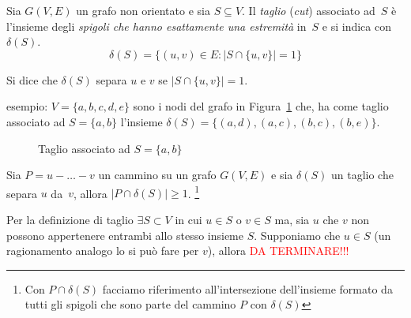 \begin{defn}[taglio]
Sia ${G(V,E)}$ un grafo non orientato e sia ${S \subseteq V}$. Il \emph{taglio} (\emph{cut})
associato ad~$S$ è l'insieme degli \emph{spigoli che hanno esattamente una estremità} 
in~$S$ e si indica con~$\delta(S)$.
\[ \delta(S) = \{(u,v) \in E \colon | S \cap \{u,v\} | = 1 \} \]
\end{defn}
Si dice che $\delta(S)$ separa $u$ e $v$ se ${|S \cap \{u,v\}| = 1}$.

\begin{ese}
esempio: ${V=\{a,b,c,d,e\}}$ sono i nodi del grafo in Figura~\ref{fig:es_taglio} che, ha come
taglio associato ad ${S = \{a, b\}}$ l'insieme ${\delta(S)= \{(a,d),(a,c),(b,c),(b,e)\}}$.
    \begin{figure}
        \centering
        \caption{Taglio associato ad $S = \{ a, b \}$} 
        \label{fig:es_taglio}
    \end{figure}
\end{ese}

\begin{thm}
Sia ${P = u - \dots - v}$ un cammino su un grafo ${G(V,E)}$ e sia $\delta(S)$ un taglio che
separa $u$ da~$v$, allora ${ |P \cap \delta(S)| \geqslant 1 }$. \footnote{Con
${P \cap \delta(S)}$ facciamo riferimento all'intersezione dell'insieme formato da
tutti gli spigoli che sono parte del cammino $P$ con $\delta(S)$}
\label{thm:taglio_cammino}
\end{thm}
\proof
Per la definizione di taglio ${\exists S \subset V}$ in cui ${u \in S}$ o ${v \in S}$ ma,
sia $u$ che $v$ non possono appertenere entrambi allo stesso insieme $S$. Supponiamo che
${u \in S}$ (un ragionamento analogo lo si può fare per $v$), allora 
\textcolor{red}{DA TERMINARE!!!}
\endproof

